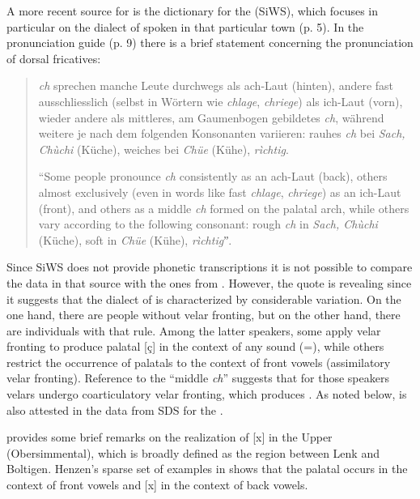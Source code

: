 \begin{sloppypar}
A more recent source for  is the dictionary for the  (SiWS), which focuses in particular on the dialect of  spoken in that particular town (p. 5). In the pronunciation guide (p. 9) there is a brief statement concerning the pronunciation of dorsal fricatives:
\end{sloppypar}

\begin{quote}\textit{ch} sprechen manche Leute durchwegs als ach-Laut (hinten), andere fast ausschliesslich (selbst in Wörtern wie \textit{chlage}, \textit{chriege}) als ich-Laut (vorn), wieder andere als mittleres, am Gaumenbogen gebildetes \textit{ch}, während weitere je nach dem folgenden Konsonanten variieren: rauhes \textit{ch} bei \textit{Sach, Chù\-chi} (Küche), weiches bei \textit{Chüe} (Kühe), \textit{rìchtig}.

“Some people pronounce \textit{ch} consistently as an ach-Laut (back), others almost exclusively (even in words like  fast \textit{chlage}, \textit{chriege}) as an ich-Laut (front), and others as a middle \textit{ch} formed on the palatal arch, while others vary according to the following consonant: rough \textit{ch} in \textit{Sach, Chùchi} (Küche), soft in \textit{Chüe} (Kühe), \textit{rìchtig}ˮ.
\end{quote}

Since SiWS does not provide phonetic transcriptions it is not possible to compare the data in that source with the ones from \citet{Zahler1901}. However, the quote is revealing since it suggests that the dialect of  is characterized by considerable variation. On the one hand, there are people without velar fronting, but on the other hand, there are individuals with that rule. Among the latter speakers, some apply velar fronting to produce palatal [ç] in the context of any sound (=), while others restrict the occurrence of palatals to the context of front vowels (assimilatory velar fronting). Reference to the “middle \textit{ch}” suggests that for those speakers velars undergo coarticulatory velar fronting, which produces . As noted below,  is also attested in the data from SDS for the .

\citet[245]{Henzen1927} provides some brief remarks on the realization of [x] in the Upper  (Obersimmental), which is broadly defined as the region between Lenk and Boltigen. Henzen’s sparse set of examples in  shows that the palatal occurs in the context of front vowels and [x] in the context of back vowels.


